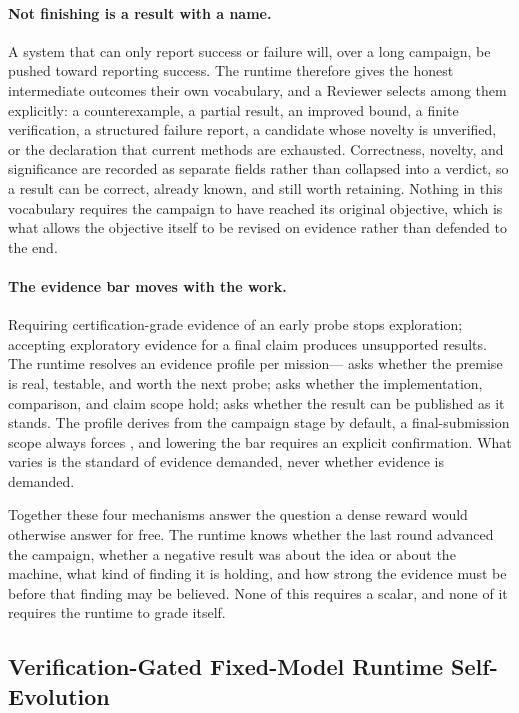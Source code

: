 \paragraph{Not finishing is a result with a name.}
A system that can only report success or failure will, over a long campaign, be
pushed toward reporting success. The runtime therefore gives the honest intermediate
outcomes their own vocabulary, and a Reviewer selects among them explicitly: a
counterexample, a partial result, an improved bound, a finite verification, a
structured failure report, a candidate whose novelty is unverified, or the
declaration that current methods are exhausted. Correctness, novelty, and
significance are recorded as separate fields rather than collapsed into a verdict, so
a result can be correct, already known, and still worth retaining. Nothing in this
vocabulary requires the campaign to have reached its original objective, which is
what allows the objective itself to be revised on evidence rather than defended to
the end.

\paragraph{The evidence bar moves with the work.}
Requiring certification-grade evidence of an early probe stops exploration; accepting
exploratory evidence for a final claim produces unsupported results. The runtime
resolves an evidence profile per mission--- asks whether the premise is
real, testable, and worth the next probe;  asks whether the
implementation, comparison, and claim scope hold;  asks whether the
result can be published as it stands. The profile derives from the campaign stage by
default, a final-submission scope always forces , and lowering the bar
requires an explicit confirmation. What varies is the standard of evidence demanded,
never whether evidence is demanded.

Together these four mechanisms answer the question a dense reward would otherwise
answer for free. The runtime knows whether the last round advanced the campaign,
whether a negative result was about the idea or about the machine, what kind of
finding it is holding, and how strong the evidence must be before that finding may be
believed. None of this requires a scalar, and none of it requires the runtime to
grade itself.

\subsection{Verification-Gated Fixed-Model Runtime Self-Evolution}

